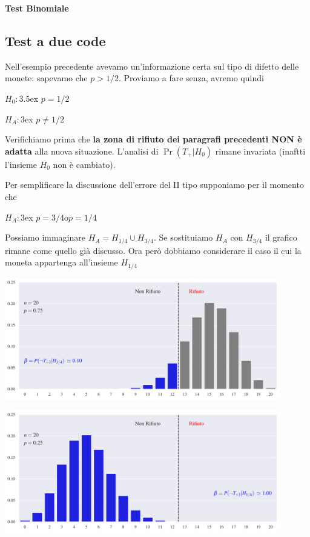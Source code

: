 \documentclass[11pt,openany]{book}
\begin{document}
\hfill{}\clearpage\hfill\textbf{Test Binomiale}\subsection{Test a due code}

Nell'esempio precedente avevamo un'informazione certa sul tipo di difetto delle monete: sapevamo che $p>1/2$. Proviamo a fare senza, avremo quindi

$H_0:$\kern3.5ex $p=1/2$

$H_A:$\kern3ex $p\neq1/2$

Verifichiamo prima che  \textbf{la zona di rifiuto dei paragrafi precedenti NON è adatta\/} alla nuova situazione. L'analisi di $\Pr(T_+|H_0)$ rimane invariata (inaftti l'insieme $H_0$ non è cambiato).

Per semplificare la discussione dell'errore del II tipo supponiamo per il momento che 

$H_A:$\kern3ex $p=3/4$\quad o\quad $p=1/4$ 

Possiamo immaginare $H_A=H_{{1/4}}\cup H_{{3/4}}$. Se sostituiamo $H_A$ con $H_{{3/4}}$ il grafico rimane come quello già discusso. Ora però dobbiamo considerare il caso il cui la moneta appartenga all'insieme $H_{{1/4}}$

\hfil\includegraphics[width=0.9\textwidth]{figure/B-test_02.pdf}

\hfil\includegraphics[width=0.9\textwidth]{figure/B-test_03.pdf}
\end{document}

